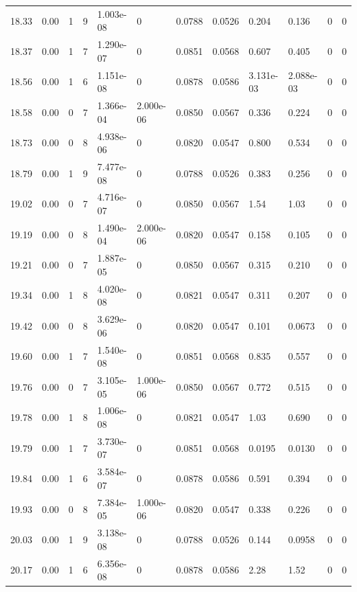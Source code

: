 \documentclass[preview]{standalone}
\begin{document}
{{{{{\begin{tabular}{L{1.2cm}C{1.2cm} C{0.3cm}C{0.5cm} C{1.4cm}C{1.4cm} C{1.4cm}C{1.4cm} C{1.6cm}C{1.6cm} C{1.6cm}C{1.6cm}}
  18.33  &  0.00  & 1     &  9 &  1.003e-08  & 0  &  0.0788&   0.0526& 0.204 & 0.136   &  0 & 0  \\ 
  18.37  &  0.00  & 1     &  7 &  1.290e-07  & 0  &  0.0851&   0.0568& 0.607 & 0.405   &  0 & 0  \\ 
  18.56  &  0.00  & 1     &  6 &  1.151e-08  & 0  &  0.0878&   0.0586& 3.131e-03 & 2.088e-03   &  0 & 0  \\ 
  18.58  &  0.00  & 0     &  7 &  1.366e-04  & 2.000e-06  &  0.0850&   0.0567& 0.336 & 0.224   &  0 & 0  \\ 
  18.73  &  0.00  & 0     &  8 &  4.938e-06  & 0  &  0.0820&   0.0547& 0.800 & 0.534   &  0 & 0  \\ 
  18.79  &  0.00  & 1     &  9 &  7.477e-08  & 0  &  0.0788&   0.0526& 0.383 & 0.256   &  0 & 0  \\ 
  19.02  &  0.00  & 0     &  7 &  4.716e-07  & 0  &  0.0850&   0.0567& 1.54 & 1.03   &  0 & 0  \\ 
  19.19  &  0.00  & 0     &  8 &  1.490e-04  & 2.000e-06  &  0.0820&   0.0547& 0.158 & 0.105   &  0 & 0  \\ 
  19.21  &  0.00  & 0     &  7 &  1.887e-05  & 0  &  0.0850&   0.0567& 0.315 & 0.210   &  0 & 0  \\ 
  19.34  &  0.00  & 1     &  8 &  4.020e-08  & 0  &  0.0821&   0.0547& 0.311 & 0.207   &  0 & 0  \\ 
  19.42  &  0.00  & 0     &  8 &  3.629e-06  & 0  &  0.0820&   0.0547& 0.101 & 0.0673   &  0 & 0  \\ 
  19.60  &  0.00  & 1     &  7 &  1.540e-08  & 0  &  0.0851&   0.0568& 0.835 & 0.557   &  0 & 0  \\ 
  19.76  &  0.00  & 0     &  7 &  3.105e-05  & 1.000e-06  &  0.0850&   0.0567& 0.772 & 0.515   &  0 & 0  \\ 
  19.78  &  0.00  & 1     &  8 &  1.006e-08  & 0  &  0.0821&   0.0547& 1.03 & 0.690   &  0 & 0  \\ 
  19.79  &  0.00  & 1     &  7 &  3.730e-07  & 0  &  0.0851&   0.0568& 0.0195 & 0.0130   &  0 & 0  \\ 
  19.84  &  0.00  & 1     &  6 &  3.584e-07  & 0  &  0.0878&   0.0586& 0.591 & 0.394   &  0 & 0  \\ 
  19.93  &  0.00  & 0     &  8 &  7.384e-05  & 1.000e-06  &  0.0820&   0.0547& 0.338 & 0.226   &  0 & 0  \\ 
  20.03  &  0.00  & 1     &  9 &  3.138e-08  & 0  &  0.0788&   0.0526& 0.144 & 0.0958   &  0 & 0  \\ 
  20.17  &  0.00  & 1     &  6 &  6.356e-08  & 0  &  0.0878&   0.0586& 2.28 & 1.52   &  0 & 0  \\ 

\end{tabular}}}}}}
\end{document}
